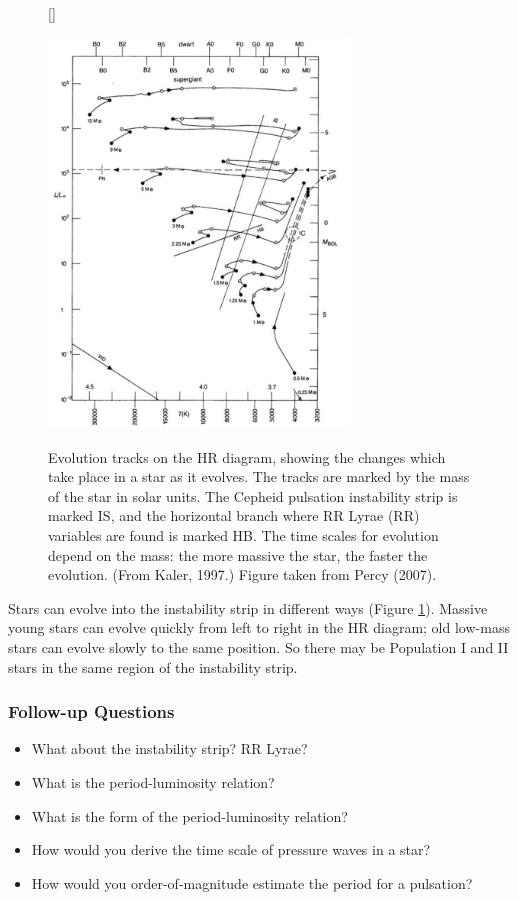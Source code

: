 \documentclass[a4paper,10pt]{article}
\begin{document}
\begin{figure}[t!]
    [\FBwidth]
    {\caption{\footnotesize{Evolution tracks on the HR diagram, showing the changes which take place in a star as it evolves. The tracks are marked by the mass of the star in solar units. The Cepheid pulsation instability strip is marked IS, and the horizontal branch where RR Lyrae (RR) variables are found is marked HB. The time scales for evolution depend on the mass: the more massive the star, the faster the evolution. (From Kaler, 1997.) Figure taken from Percy (2007).}}
    \label{fig:inststripevol}}
    {\includegraphics[width=8cm]{figures/InstStripEvol.png}}
\end{figure}

{\noindent}Stars can evolve into the instability strip in different ways (Figure \ref{fig:inststripevol}). Massive young stars can evolve quickly from left to right in the HR diagram; old low-mass stars can evolve slowly to the same position. So there may be Population I and II stars in the same region of the instability strip.

\newpage
\subsubsection{Follow-up Questions}

\begin{itemize}
    \item What about the instability strip? RR Lyrae?
    \item What is the period-luminosity relation?
    \item What is the form of the period-luminosity relation?
    \item How would you derive the time scale of pressure waves in a star?
    \item How would you order-of-magnitude estimate the period for a pulsation?
\end{itemize}
\end{document}
